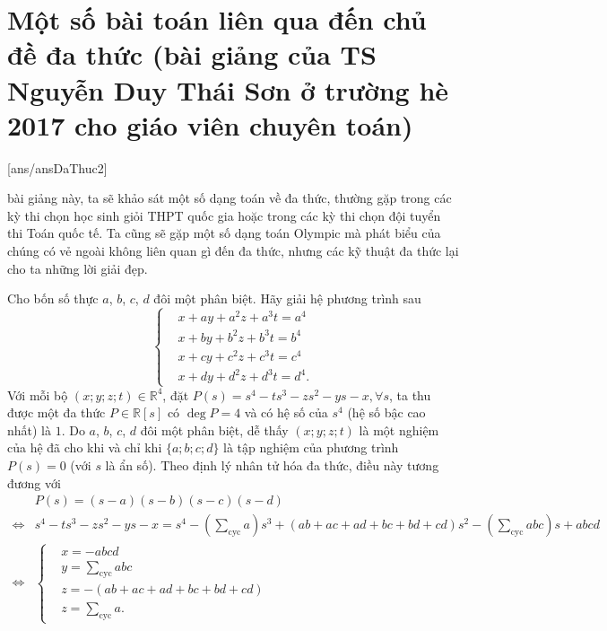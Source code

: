 \section{Một số bài toán liên qua đến chủ đề đa thức (bài giảng của TS Nguyễn Duy Thái Sơn ở trường hè 2017 cho giáo viên chuyên toán)}
[ans/ansDaThuc2]
\begin{center}
 \textbf{\color{violet}{\Large MỘT SỐ BÀI TOÁN \\ LIÊN QUAN ĐẾN CHỦ ĐỀ ĐA THỨC}}
\end{center}
\begin{center}
	\textbf{\color{violet}{Nguyễn Duy Thái Sơn\\
			(Đại học Sư phạm – Đại học Đà Nẵng)}}
\end{center}
 bài giảng này, ta sẽ khảo sát một số dạng toán về đa thức, thường gặp trong các kỳ thi chọn học
sinh giỏi THPT quốc gia hoặc trong các kỳ thi chọn đội tuyển thi Toán quốc tế. Ta cũng sẽ gặp một
số dạng toán Olympic mà phát biểu của chúng có vẻ ngoài không liên quan gì đến đa thức, nhưng
các kỹ thuật đa thức lại cho ta những lời giải đẹp.


\begin{bt}%
 Cho bốn số thực $a$, $b$, $c$, $d$ đôi một phân biệt. Hãy giải hệ phương trình sau
 $$\left\{\begin{aligned}&x+ay+a^2z+a^3t=a^4	\\&x+by+b^2z+b^3t=b^4	\\&x+cy+c^2z+c^3t=c^4	\\&x+dy+d^2z+d^3t=d^4.\end{aligned}\right.$$
 \loigiai
  {
  Với mỗi bộ $(x;y;z;t)\in\mathbb{R}^4$, đặt $P(s)=s^4-ts^3-zs^2-ys-x,\forall s$, ta thu được một đa thức $P\in\mathbb{R}[s]$ có $\deg P=4$ và có hệ số của $s^4$ (hệ số bậc cao nhất) là $1$. Do $a$, $b$, $c$, $d$ đôi một phân biệt, dễ thấy $(x;y;z;t)$ là một nghiệm của hệ đã cho khi và chỉ khi $\{a;b;c;d\}$ là tập nghiệm của phương trình $P(s)=0$ (với $s$ là ẩn số). Theo định lý nhân tử hóa đa thức, điều này tương đương với
{\allowdisplaybreaks
\begin{align*}
   & P(s) = (s-a)(s-b)(s-c)(s-d)\\
   \Leftrightarrow & s^4-ts^3-zs^2-ys-x = s^4-\left(\displaystyle\sum\limits_{\mathrm{cyc}}a\right)s^3+(ab+ac+ad+bc+bd+cd)s^2 -\left(\displaystyle\sum\limits_{\mathrm{cyc}}abc\right)s+abcd\\
   \Leftrightarrow & \left\{\begin{aligned}&x=-abcd \\&y=\displaystyle\sum\limits_{\mathrm{cyc}}abc \\&z=-(ab+ac+ad+bc+bd+cd) \\&z=\displaystyle\sum\limits_{\mathrm{cyc}}a.\end{aligned}\right.
  \end{align*}}
  }
\end{bt}

